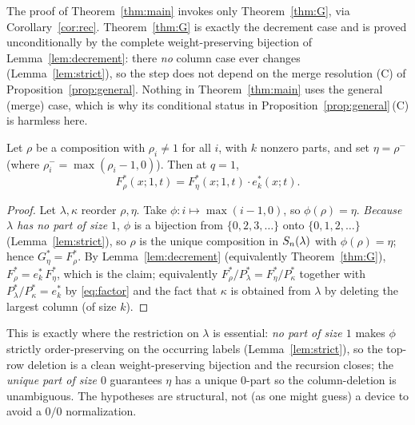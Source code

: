 \begin{qthreeremark}
The proof of Theorem~\ref{thm:main} invokes only Theorem~\ref{thm:G}, via
Corollary~\ref{cor:rec}. Theorem~\ref{thm:G} is exactly the decrement case and is
proved unconditionally by the complete weight-preserving bijection of
Lemma~\ref{lem:decrement}: there \emph{no} column case ever changes
(Lemma~\ref{lem:strict}), so the step does not depend on the merge resolution
\textup{(C)} of Proposition~\ref{prop:general}. Nothing in
Theorem~\ref{thm:main} uses the general (merge) case, which is why its conditional
status in Proposition~\ref{prop:general}\,\textup{(C)} is harmless here.
\end{qthreeremark}

\begin{qthreecorollary}\label{cor:rec}
Let $\rho$ be a composition with $\rho_i\ne1$ for all $i$, with $k$ nonzero parts,
and set $\eta=\rho^-$ (where $\rho^-_i=\max(\rho_i-1,0)$). Then at $q=1$,
\[
F^*_\rho(x;1,t)=F^*_\eta(x;1,t)\cdot e^*_k(x;t).
\]
\end{qthreecorollary}

\begin{proof}
Let $\lambda,\kappa$ reorder $\rho,\eta$. Take $\phi:i\mapsto\max(i-1,0)$, so
$\phi(\rho)=\eta$. \emph{Because $\lambda$ has no part of size $1$}, $\phi$ is a
bijection from $\{0,2,3,\dots\}$ onto $\{0,1,2,\dots\}$ (Lemma~\ref{lem:strict}),
so $\rho$ is the unique composition in $S_n(\lambda)$ with $\phi(\rho)=\eta$; hence
$G^*_\eta=F^*_\rho$. By Lemma~\ref{lem:decrement} (equivalently
Theorem~\ref{thm:G}), $F^*_\rho=e^*_k\,F^*_\eta$, which is the claim; equivalently
$F^*_\rho/P^*_\lambda=F^*_\eta/P^*_\kappa$ together with
$P^*_\lambda/P^*_\kappa=e^*_k$ by \eqref{eq:factor} and the fact that $\kappa$ is
obtained from $\lambda$ by deleting the largest column (of size $k$).
\end{proof}

This is exactly where the restriction on $\lambda$ is essential: \emph{no part of
size $1$} makes $\phi$ strictly order-preserving on the occurring labels
(Lemma~\ref{lem:strict}), so the top-row deletion is a clean weight-preserving
bijection and the recursion closes; the \emph{unique part of size $0$} guarantees
$\eta$ has a unique $0$-part so the column-deletion is unambiguous. The hypotheses
are structural, not (as one might guess) a device to avoid a $0/0$ normalization.

